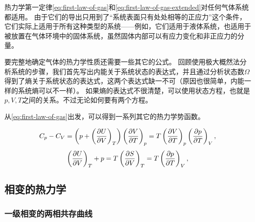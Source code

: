\documentclass[hyperref, UTF8, a4paper]{ctexart}
\begin{document}
热力学第一定律\eqref{eq:first-law-of-gas}和\eqref{eq:first-law-of-gas-extended}对任何气体系统都适用。
由于它们的导出只用到了“系统表面只有处处相等的正应力”这个条件，它们实际上适用于所有这种类型的系统——例如，它们适用于液体系统，也适用于被放置在气体环境中的固体系统，虽然固体内部可以有应力变化和非正应力的分量。

要完整地确定气体的热力学性质还需要一些其它的公式。
回顾使用极大概然法分析系统的步骤，我们首先写出内能关于系统状态的表达式，并且通过分析状态数$\Omega$得到了熵关于系统状态的表达式，这两个表达式缺一不可（原因也很简单，内能一样的系统熵可以不一样）。
如果熵的表达式不很清楚，可以使用状态方程，也就是$p, V, T$之间的关系。不过无论如何要有两个方程。

从\eqref{eq:first-law-of-gas}出发，可以得到一系列其它的热力学势函数。

\begin{equation}
    C_p - C_V = \left( p + \left(\pdv{U}{V}\right)_T \right) \left(\pdv{V}{T}\right)_p = T \left(\pdv{V}{T}\right)_p \left(\pdv{p}{T}\right)_V,
\end{equation}
\begin{equation}
    \left(\pdv{U}{V}\right)_T + p = T \left(\pdv{S}{V}\right)_T = T \left(\pdv{p}{T}\right)_V,
\end{equation}

\subsection{相变的热力学}

\subsubsection{一级相变的两相共存曲线}
\end{document}
